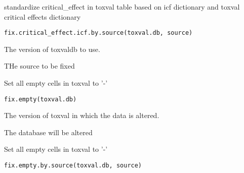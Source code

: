 \documentclass[letterpaper]{book}
\begin{document}
%
\begin{Description}\relax
standardize critical\_effect in toxval table based on icf dictionary and toxval critical effects dictionary
\end{Description}
%
\begin{Usage}
\begin{verbatim}
fix.critical_effect.icf.by.source(toxval.db, source)
\end{verbatim}
\end{Usage}
%
\begin{Arguments}
\begin{ldescription}
\item[\code{toxval.db}] The version of toxvaldb to use.

\item[\code{source}] THe source to be fixed
\end{ldescription}
\end{Arguments}
%
\begin{Description}\relax
Set all empty cells in toxval to '-'
\end{Description}
%
\begin{Usage}
\begin{verbatim}
fix.empty(toxval.db)
\end{verbatim}
\end{Usage}
%
\begin{Arguments}
\begin{ldescription}
\item[\code{toxval.db}] The version of toxval in which the data is altered.
\end{ldescription}
\end{Arguments}
%
\begin{Value}
The database will be altered
\end{Value}
%
\begin{Description}\relax
Set all empty cells in toxval to '-'
\end{Description}
%
\begin{Usage}
\begin{verbatim}
fix.empty.by.source(toxval.db, source)
\end{verbatim}
\end{Usage}
\end{document}
